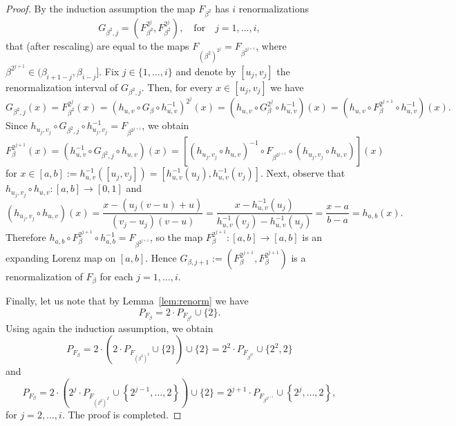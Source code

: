 \documentclass[10pt,a4paper]{amsart}
\begin{document}
\begin{proof}
By the induction assumption the map $F_{\beta^2}$ has $i$ renormalizations 
$$
    G_{\beta^2,j}=(F^{2^j}_{\beta^2},F^{2^j}_{\beta^2}),\quad\text{for}\quad j=1,\ldots,i,
$$ 
that (after rescaling) are equal to the maps $F_{(\beta^2)^{2^j}}=F_{\beta^{2^{j+1}}}$, where $\beta^{2^{j+1}}\in(\beta_{i+1-j},\beta_{i-j}]$. Fix $j\in\{1,\ldots,i\}$ and denote by $[u_j,v_j]$ the renormalization interval of $G_{\beta^2,j}$. Then, for every $x\in[u_j,v_j]$ we have
$$
G_{\beta^2,j}(x)=F^{2^j}_{\beta^2}(x)=\left(h_{u,v}\circ G_{\beta}\circ h^{-1}_{u,v}\right)^{2^j}(x)=\left(h_{u,v}\circ G_{\beta}^{2^j}\circ h^{-1}_{u,v}\right)(x)=\left(h_{u,v}\circ F_{\beta}^{2^{j+1}}\circ h^{-1}_{u,v}\right)(x).
$$
Since $h_{u_j,v_j}\circ G_{\beta^2,j}\circ h^{-1}_{u_j,v_j}=F_{\beta^{2^{j+1}}}$, we obtain
$$
F_{\beta}^{2^{j+1}}(x)=\left(h_{u,v}^{-1}\circ G_{\beta^2,j}\circ h_{u,v}\right)(x)=\left[(h_{u_j,v_j}\circ h_{u,v})^{-1}\circ F_{\beta^{2^{j+1}}}\circ(h_{u_j,v_j}\circ h_{u,v})\right](x)
$$
for $x\in[a,b]:=h_{u,v}^{-1}([u_j,v_j])=[h_{u,v}^{-1}(u_j),h_{u,v}^{-1}(v_j)]$. Next, observe that $h_{u_j,v_j}\circ h_{u,v}\colon[a,b]\to[0,1]$ and
$$
\left(h_{u_j,v_j}\circ h_{u,v}\right)(x)=\frac{x-(u_j(v-u)+u)}{(v_j-u_j)(v-u)}=\frac{x-h_{u,v}^{-1}(u_j)}{h_{u,v}^{-1}(v_j)-h_{u,v}^{-1}(u_j)}=\frac{x-a}{b-a}=h_{a,b}(x).
$$
Therefore $h_{a,b}\circ F_{\beta}^{2^{j+1}}\circ h^{-1}_{a,b}=F_{\beta^{2^{j+1}}}$, so the map $F_{\beta}^{2^{j+1}}\colon[a,b]\to[a,b]$ is an expanding Lorenz map on $[a,b]$. Hence $G_{\beta,j+1}:=(F_{\beta}^{2^{j+1}},F_{\beta}^{2^{j+1}})$ is a renormalization of $F_{\beta}$ for each $j=1,\ldots,i$.

Finally, let us note that by Lemma~\ref{lem:renorm} we have
$$
P_{F_{\beta}}=2\cdot P_{F_{\beta^{2}}}\cup\{2\}.
$$
Using again the induction assumption, we obtain
$$
P_{F_{\beta}}=2\cdot\left(2\cdot P_{F_{(\beta^2)^{2}}}\cup\{2\}\right)\cup\{2\}=2^2\cdot P_{F_{\beta^{2^2}}}\cup\{2^2,2\}
$$
and
$$
P_{F_{\beta}}=2\cdot\left(2^{j}\cdot P_{F_{(\beta^2)^{2^j}}}\cup\left\lbrace2^{j-1},\ldots,2\right\rbrace\right)\cup\{2\}=2^{j+1}\cdot P_{F_{\beta^{2^{j+1}}}}\cup\left\lbrace2^{j},\ldots,2\right\rbrace,
$$
for $j=2,\ldots,i$. The proof is completed.
\end{proof}
\end{document}
